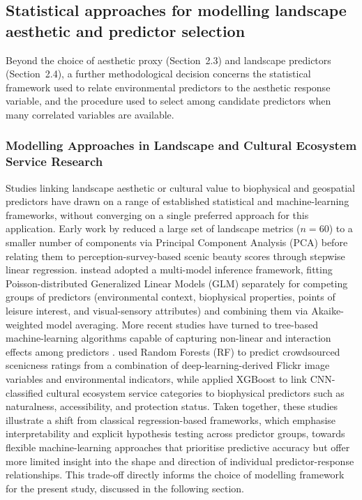 \documentclass[11pt]{article}
\renewcommand{\_}{\textunderscore\allowbreak{}}
\begin{document}
\subsection{Statistical approaches for modelling landscape aesthetic and predictor selection}\label{sec:ModelSOTA}

Beyond the choice of aesthetic proxy (Section~2.3) and landscape predictors (Section~2.4), a further methodological decision concerns the statistical framework used to relate environmental predictors to the aesthetic response variable, and the procedure used to select among candidate predictors when many correlated variables are available.

\subsubsection{Modelling Approaches in Landscape and Cultural Ecosystem Service Research}

Studies linking landscape aesthetic or cultural value to biophysical and geospatial predictors have drawn on a range of established statistical and machine-learning frameworks, without converging on a single preferred approach for this application. Early work by \citet{schirpke_predicting_2013} reduced a large set of landscape metrics ($n = 60$) to a smaller number of components via Principal Component Analysis (PCA) before relating them to perception-survey-based scenic beauty scores through stepwise linear regression. \citet{vaz_digital_2020} instead adopted a multi-model inference framework, fitting Poisson-distributed Generalized Linear Models (GLM) separately for competing groups of predictors (environmental context, biophysical properties, points of leisure interest, and visual-sensory attributes) and combining them via Akaike-weighted model averaging. More recent studies have turned to tree-based machine-learning algorithms capable of capturing non-linear and interaction effects among predictors \citep{comalada_modelling_2025,havinga_social_2021}. \citet{havinga_social_2021} used Random Forests (RF) to predict crowdsourced scenicness ratings from a combination of deep-learning-derived Flickr image variables and environmental indicators, while \citet{comalada_modelling_2025} applied XGBoost to link CNN-classified cultural ecosystem service categories to biophysical predictors such as naturalness, accessibility, and protection status. Taken together, these studies illustrate a shift from classical regression-based frameworks, which emphasise interpretability and explicit hypothesis testing across predictor groups, towards flexible machine-learning approaches that prioritise predictive accuracy but offer more limited insight into the shape and direction of individual predictor-response relationships. This trade-off directly informs the choice of modelling framework for the present study, discussed in the following section.
\end{document}
